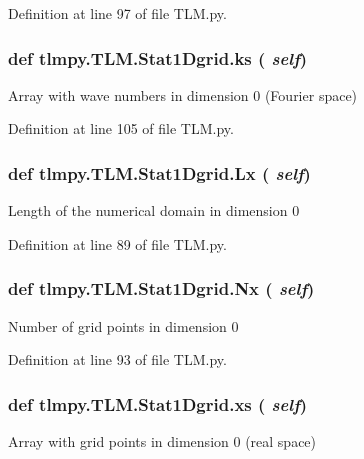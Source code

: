 Definition at line 97 of file TLM.py.\hypertarget{classtlmpy_1_1TLM_1_1Stat1Dgrid_a52b44a41fb758b12f640a57ed7642e78}{
\subsubsection[{ks}]{\setlength{\rightskip}{0pt plus 5cm}def tlmpy.TLM.Stat1Dgrid.ks ( {\em self})}}
\label{classtlmpy_1_1TLM_1_1Stat1Dgrid_a52b44a41fb758b12f640a57ed7642e78}
\begin{DoxyVerb}Array with wave numbers in dimension 0 (Fourier space)\end{DoxyVerb}
 

Definition at line 105 of file TLM.py.\hypertarget{classtlmpy_1_1TLM_1_1Stat1Dgrid_ad797c03dab5d10181e82e2bf1bd9c9dd}{
\subsubsection[{Lx}]{\setlength{\rightskip}{0pt plus 5cm}def tlmpy.TLM.Stat1Dgrid.Lx ( {\em self})}}
\label{classtlmpy_1_1TLM_1_1Stat1Dgrid_ad797c03dab5d10181e82e2bf1bd9c9dd}
\begin{DoxyVerb}Length of the numerical domain in dimension 0\end{DoxyVerb}
 

Definition at line 89 of file TLM.py.\hypertarget{classtlmpy_1_1TLM_1_1Stat1Dgrid_ae20c15d7b6d53b59577b562f9db8e213}{
\subsubsection[{Nx}]{\setlength{\rightskip}{0pt plus 5cm}def tlmpy.TLM.Stat1Dgrid.Nx ( {\em self})}}
\label{classtlmpy_1_1TLM_1_1Stat1Dgrid_ae20c15d7b6d53b59577b562f9db8e213}
\begin{DoxyVerb}Number of grid points in dimension 0\end{DoxyVerb}
 

Definition at line 93 of file TLM.py.\hypertarget{classtlmpy_1_1TLM_1_1Stat1Dgrid_ab35836c753c29d15640e3b7478b16a09}{
\subsubsection[{xs}]{\setlength{\rightskip}{0pt plus 5cm}def tlmpy.TLM.Stat1Dgrid.xs ( {\em self})}}
\label{classtlmpy_1_1TLM_1_1Stat1Dgrid_ab35836c753c29d15640e3b7478b16a09}
\begin{DoxyVerb}Array with grid points in dimension 0 (real space)\end{DoxyVerb}
 

